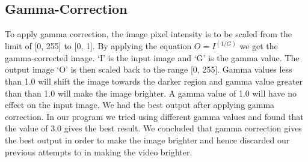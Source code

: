 \documentclass[12pt]{report}
\begin{document}
{\subsection*{Gamma-Correction} 
To apply gamma correction, the image pixel intensity is to be scaled from the limit of [0, 255] to [0, 1]. By applying the equation $O = I^{(1/G)}$ we get the gamma-corrected image. \newline
‘I’ is the input image and ‘G’ is the gamma value. The output image ‘O’ is then scaled back to the range [0, 255]. \newline
Gamma values less than 1.0 will shift the image towards the darker region and gamma value greater than than 1.0 will make the image brighter. A gamma value of 1.0 will have no effect on the input image.
We had the best output after applying gamma correction. \newline
In our program we tried using different gamma values and found that the value of 3.0 gives the best result. \newline 
We concluded that gamma correction gives the best output in order to make the image brighter and hence discarded our previous attempts to in making the video brighter. \newline

}
\end{document}

